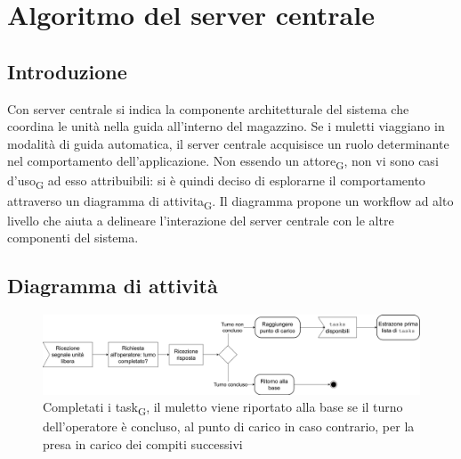 \section{Algoritmo del server centrale}
\subsection{Introduzione}
Con server centrale si indica la componente architetturale del sistema che coordina le unità nella guida all'interno del magazzino. Se i muletti viaggiano in modalità di guida automatica, il server centrale acquisisce un ruolo determinante nel comportamento dell'applicazione. Non essendo un attore\textsubscript{G}, non vi sono casi d'uso\textsubscript{G} ad esso attribuibili: si è quindi deciso di esplorarne il comportamento attraverso un diagramma di attivita\textsubscript{G}. Il diagramma propone un workflow ad alto livello che aiuta a delineare l'interazione del server centrale con le altre componenti del sistema.



\subsection{Diagramma di attività}



\begin{figure}[H]
	\centering
	\includegraphics[scale=0.35]{res/images/diagramma_di_attivita1.png}
	\caption[Diagramma di attivita\textsubscript{G} per la gestione del muletto dopo il completamento della lista di tasks]{Completati i task\textsubscript{G}, il muletto viene riportato alla base se il turno dell'operatore è concluso, al punto di carico in caso contrario, per la presa in carico dei compiti successivi}
\end{figure}



